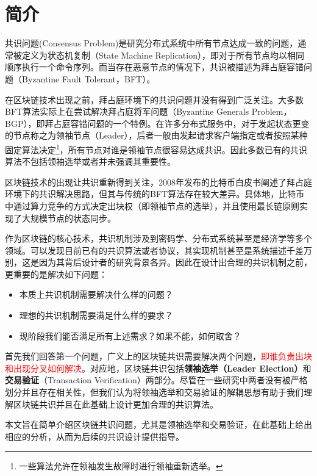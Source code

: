 \section{简介}
共识问题(Consensus Problem)是研究分布式系统中所有节点达成一致的问题，通常被定义为状态机复制（State Machine Replication），即对于所有节点均以相同顺序执行一个命令序列。而当存在恶意节点的情况下，共识被描述为拜占庭容错问题（Byzantine Fault Tolerant，BFT）\cite{pease1980reaching}。

在区块链技术出现之前，拜占庭环境下的共识问题并没有得到广泛关注。大多数BFT算法实际上在尝试解决拜占庭将军问题（Byzantine Generals Problem，BGP）\cite{lamport1982byzantine}，即拜占庭容错问题的一个特例。在许多分布式服务中，对于发起状态更变的节点称之为领袖节点（Leader），后者一般由发起请求客户端指定或者按照某种固定算法决定\footnote{一些算法允许在领袖发生故障时进行领袖重新选举。}，所有节点对谁是领袖节点很容易达成共识。因此多数已有的共识算法不包括领袖选举或者并未强调其重要性。


区块链技术的出现让共识重新得到关注，2008年发布的比特币白皮书\cite{nakamoto2008bitcoin}阐述了拜占庭环境下的共识解决思路，但其与传统的BFT算法存在较大差异。具体地，比特币中通过算力竞争的方式决定出块权（即领袖节点的选举），并且使用最长链原则实现了大规模节点的状态同步。

作为区块链的核心技术，共识机制涉及到密码学、分布式系统甚至是经济学等多个领域。可以发现目前已有的共识算法或者协议，其实现机制甚至是系统描述千差万别，这是因为其背后设计者的研究背景各异。因此在设计出合理的共识机制之前，更重要的是解决如下问题：

\begin{itemize}
	\item 本质上共识机制需要解决什么样的问题？
	\item 理想的共识机制需要满足什么样的要求？
	\item 现阶段我们能否满足所有上述需求？如果不能，如何取舍？
\end{itemize}

首先我们回答第一个问题，广义上的区块链共识需要解决两个问题，\textcolor{red}{即谁负责出块和出现分叉如何解决}。对应地，区块链共识包括\textbf{领袖选举（Leader Election）}和\textbf{交易验证}（Transaction Verification）两部分\cite{eyal2016bitcoin,kogias2016enhancing}。尽管在一些研究中两者没有被严格划分并且存在相关性\cite{gilad2017algorand}，但我们认为将领袖选举和交易验证的解耦思想有助于我们理解区块链共识并且在此基础上设计更加合理的共识算法。

本文旨在简单介绍区块链共识问题，尤其是领袖选举和交易验证，在此基础上给出相应的分析，从而为后续的共识设计提供指导。


